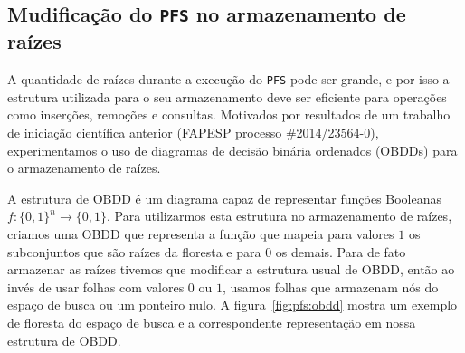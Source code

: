 \documentclass[12pt]{article}
\newcommand{\algname}[1]{\texttt{#1}}
\begin{document}
\subsection{Mudificação do \algname{PFS} no armazenamento de raízes}
A quantidade de raízes durante a execução do \algname{PFS} pode ser 
grande, e por isso a estrutura utilizada para o seu armazenamento deve
ser eficiente para operações como inserções, remoções e consultas. 
Motivados por resultados de um trabalho de iniciação científica 
anterior (FAPESP processo \#2014/23564-0), experimentamos o uso de
diagramas de decisão binária ordenados (OBDDs) para o armazenamento
de raízes.

A estrutura de OBDD é um diagrama capaz de representar funções Booleanas
$f: \{0, 1\}^n \to \{0, 1\}$. Para utilizarmos esta estrutura no 
armazenamento de raízes, criamos uma OBDD que representa a função que 
mapeia para valores $1$ os subconjuntos que são raízes da floresta
e para $0$ os demais. Para de fato armazenar as raízes tivemos que 
modificar a estrutura usual de OBDD, então ao invés de usar folhas com 
valores $0$ ou $1$, usamos folhas que armazenam nós do espaço de busca
ou um ponteiro nulo. A figura~\ref{fig:pfs:obdd} mostra um exemplo de 
floresta do espaço de busca e a correspondente representação em nossa 
estrutura de OBDD. 
\end{document}
